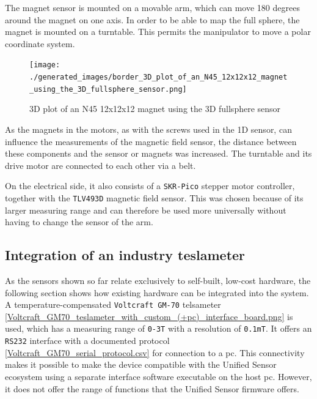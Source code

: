 The magnet sensor is mounted on a movable arm, which can move 180
degrees around the magnet on one axis. In order to be able to map the
full sphere, the magnet is mounted on a turntable. This permits the
manipulator to move a polar coordinate system.

\begin{figure}
\centering
\texttt{[image: ./generated\_images/border\_3D\_plot\_of\_an\_N45\_12x12x12\_magnet\_using\_the\_3D\_fullsphere\_sensor.png]}
\caption{3D plot of an N45 12x12x12 magnet using the 3D fullsphere
sensor
\label{3D_plot_of_an_N45_12x12x12_magnet_using_the_3D_fullsphere_sensor.png}}
\end{figure}

As the magnets in the motors, as with the screws used in the 1D sensor,
can influence the measurements of the magnetic field sensor, the
distance between these components and the sensor or magnets was
increased. The turntable and its drive motor are connected to each other
via a belt.

On the electrical side, it also consists of a
\passthrough{\lstinline!SKR-Pico!} stepper motor controller, together
with the \passthrough{\lstinline!TLV493D!} magnetic field sensor. This
was chosen because of its larger measuring range and can therefore be
used more universally without having to change the sensor of the arm.

\hypertarget{integration-of-an-industry-teslameter}{%
\subsection{Integration of an industry
teslameter}\label{integration-of-an-industry-teslameter}}

As the sensors shown so far relate exclusively to self-built, low-cost
hardware, the following section shows how existing hardware can be
integrated into the system. A temperature-compensated
\passthrough{\lstinline!Voltcraft GM-70!} telsameter
\ref{Voltcraft_GM70_teslameter_with_custom_(+pc)_interface_board.png} is
used, which has a measuring range of \passthrough{\lstinline!0-3T!} with
a resolution of \passthrough{\lstinline!0.1mT!}. It offers an
\passthrough{\lstinline!RS232!} interface with a documented protocol
\ref{Voltcraft_GM70_serial_protocol.csv} for connection to a \gls{pc}.
This connectivity makes it possible to make the device compatible with
the Unified Sensor ecosystem using a separate interface software
\cite{VoltcraftGM70Rest} executable on the host \gls{pc}. However,
it does not offer the range of functions that the Unified Sensor
firmware offers.

